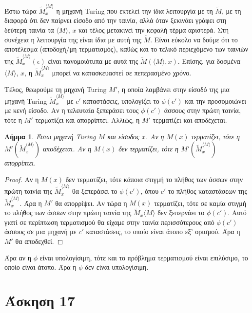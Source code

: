 \documentclass[a4paper, oneside, 11pt]{article}
\newtheorem{lm}[thm]{Λήμμα}
\theoremstyle{definition}
\begin{document}
Έστω τώρα $\widetilde{M}_{x}^{\langle M\rangle}$ η μηχανή Turing που εκτελεί την ίδια λειτουργία
με τη $\widetilde{M}$, με τη διαφορά ότι δεν παίρνει είσοδο από την ταινία, αλλά όταν ξεκινάει γράφει στη δεύτερη
ταινία τα $\langle M\rangle$, $x$ και τέλος μετακινεί την κεφαλή τέρμα αριστερά. Στη συνέχεια
η λειτουργία της είναι ίδια με αυτή της $\widetilde{M}$.
Είναι εύκολο να δούμε ότι το αποτέλεσμα (αποδοχή/μη τερματισμός), καθώς και το τελικό 
περιεχόμενο των ταινιών της $\widetilde{M}_{x}^{\langle M\rangle}(\epsilon)$ είναι πανομοιότυπα με αυτά της 
$\widetilde{M}(\langle M\rangle, x)$. Επίσης, για δοσμένα $\langle M\rangle$, $x$, η
$\widetilde{M}_{x}^{\langle M\rangle}$
μπορεί να κατασκευαστεί σε πεπερασμένο χρόνο.

Τέλος, θεωρούμε τη μηχανή Turing $M'$, η οποία λαμβάνει στην είσοδό της μια μηχανή Turing 
$\widetilde{M}_x^{\langle M\rangle}$ με $c'$
καταστάσεις, υπολογίζει το $\phi(c')$ και την προσομοιώνει με κενή είσοδο. 
Αν η τελευταία ξεπεράσει τους
$\phi(c')$ άσσους στην πρώτη ταινία, τότε η $M'$ τερματίζει και απορρίπτει.
Αλλιώς, η $M'$ τερματίζει και αποδέχεται.

\begin{lm}
Έστω μηχανή Turing $M$ και είσοδος $x$. Αν η $M(x)$ τερματίζει, τότε η $M'(\widetilde{M}_x^{\langle M\rangle})$
αποδέχεται. Αν η $M(x)$ δεν τερματίζει, τότε η $M'(\widetilde{M}_x^{\langle M\rangle})$ απορρίπτει.
\end{lm}
\begin{proof}
Αν η $M(x)$ δεν τερματίζει, τότε κάποια στιγμή το πλήθος των άσσων στην πρώτη ταινία της 
$\widetilde{M}_x^{\langle M\rangle}$
θα ξεπεράσει το $\phi(c')$, όπου $c'$ το πλήθος καταστάσεων της $\widetilde{M}_x^{\langle M\rangle}$. 
Άρα η $M'$ θα απορρίψει.
Αν τώρα η $M(x)$ τερματίζει, τότε σε καμία στιγμή το πλήθος των άσσων στην πρώτη ταινία της 
$\widetilde{M}_x{\langle M\rangle}$
δεν ξεπερνάει το $\phi(c')$. Αυτό γιατί σε περίπτωση τερματισμού θα είχαμε στην ταινία περισσότερους από $\phi(c')$
άσσους σε μια μηχανή με $c'$ καταστάσεις, το οποίο είναι άτοπο εξ' ορισμού. Άρα η $M'$ θα αποδεχθεί.
\end{proof}

Άρα αν η $\phi$ είναι υπολογίσιμη, τότε και το πρόβλημα τερματισμού είναι επιλύσιμο, το οποίο είναι άτοπο.
Άρα η $\phi$ δεν είναι υπολογίσιμη.

\section*{Άσκηση 17}
\end{document}
